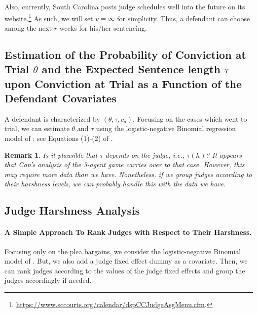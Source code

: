 \documentclass[11pt, oneside]{article}   	%
\theoremstyle{ModifiedStyle}
\newtheorem{remark}{Remark}
\begin{document}
Also, currently, South Carolina posts judge schedules well into the future on its website.\footnote{\url{https://www.sccourts.org/calendar/dspCCJudgeAsgMenu.cfm}.} As such, we will set $v=\infty$ for simplicity. Thus, a defendant can choose among the next $r$ weeks for his/her sentencing.

\subsection{Estimation of the Probability of Conviction at Trial $\theta$ and the Expected Sentence length $\tau$ upon Conviction at Trial as a Function of the Defendant Covariates}
\label{Sec:Estimation:Probability_Of_Conviction_And_Sentence_Length}
A defendant is characterized by $(\theta,\tau,c_d)$. Focusing on the cases which went to trial, we can estimate $\theta$ and $\tau$ using the logistic-negative Binomial regression model of \citet{Hester_Hartman_2017}; see Equations (1)-(2) of \citet{Hester_Hartman_2017}.
\begin{remark}
	Is it plausible that $\tau$ depends on the judge, i.e., $\tau(h)$? It appears that Can's analysis of the 3-agent game carries over to that case. However, this may require more data than we have. Nonetheless, if we group judges according to their harshness levels, we can probably handle this with the data we have.
\end{remark}

\subsection{Judge Harshness Analysis}
\label{Sec:Judge_Harshness_Analysis}

\vspace{-3mm}
\paragraph{A Simple Approach To Rank Judges with Respect to Their Harshness.} Focusing only on the plea bargains, we consider the logistic-negative Binomial model of \citet{Hester_Hartman_2017}. But, we also add a judge fixed effect dummy as a covariate. Then, we can rank judges according to the values of the judge fixed effects and group the judges accordingly if needed.
%
\vspace{-3mm}
\end{document}
